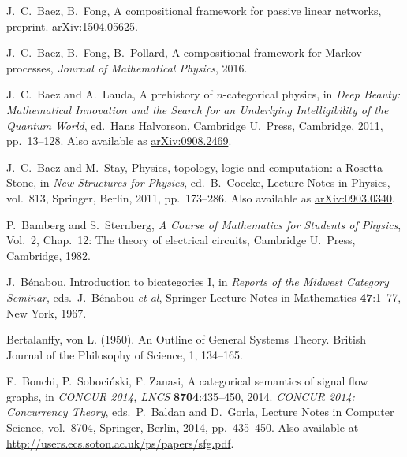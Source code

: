 \begin{thebibliography}{RSW00}
     J.\ C.\ Baez, B.\ Fong, A compositional framework for passive
    linear networks, preprint. \href{http://arxiv.org/abs/1504.05625}{arXiv:1504.05625}. 

     J.\ C.\ Baez, B.\ Fong, B.\ Pollard, A
    compositional framework for Markov processes, {\sl Journal of Mathematical
    Physics}, 2016.

     J.\ C.\ Baez and A.\ Lauda, A prehistory of $n$-categorical
    physics, in {\sl Deep Beauty: Mathematical Innovation and
    the Search for an Underlying Intelligibility of the Quantum World}, ed.\
    Hans Halvorson, Cambridge U.\ Press, Cambridge, 2011, pp.\ 13--128.  
    Also available as \href{http://arxiv.org/abs/0908.2469}{arXiv:0908.2469}.

     J.\ C.\ Baez and M.\ Stay,  Physics, topology, logic and 
    computation: a Rosetta Stone, in {\sl New Structures for Physics}, ed.\ B.\ Coecke,  
    Lecture Notes in Physics, vol.\ 813, Springer, Berlin, 2011, pp.\ 173--286.  Also
    available as \href{http://arxiv.org/abs/0903.0340}{arXiv:0903.0340}.

     P.\ Bamberg and S.\ Sternberg, {\sl A Course of Mathematics for
    Students of Physics}, Vol.\ 2, Chap.\ 12: The theory of electrical circuits,
    Cambridge U.\ Press, Cambridge, 1982. 

     J.\ B\'enabou, Introduction to bicategories I, in \textsl{Reports
    of the Midwest Category Seminar}, eds.\ J.\ B\'enabou \textit{et al},
    Springer Lecture Notes in Mathematics {\bf 47}:1--77, New York, 1967.


     Bertalanffy, von L. (1950). An Outline of General
    Systems Theory. British Journal of the Philosophy of Science, 1, 134--165.

     F.\ Bonchi, P.\ Soboci\'nski, F. Zanasi, A categorical
    semantics of signal flow graphs, in \emph{CONCUR 2014, LNCS} {\bf
    8704}:435--450, 2014.
    \textsl{CONCUR 2014: Concurrency Theory}, 
    eds.\ P.\ Baldan and D.\ Gorla, Lecture Notes in Computer Science, vol.\ 8704, 		
    Springer, Berlin, 2014, pp.\ 435--450.  Also available at
    \href{http://users.ecs.soton.ac.uk/ps/papers/sfg.pdf}
    {http://users.ecs.soton.ac.uk/ps/papers/sfg.pdf}.


\end{thebibliography}
